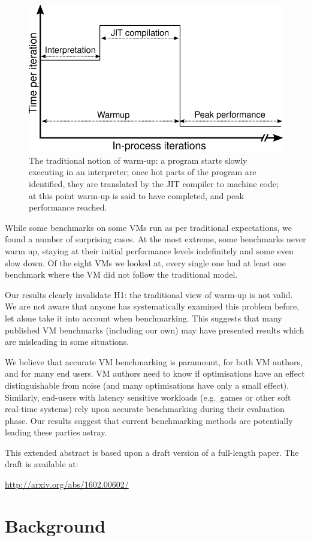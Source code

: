 \documentclass[preprint]{sigplanconf}
\newcommand{\hypone}{H1\xspace}
\begin{document}
\begin{figure}[t]
\centering
\includegraphics[width=.5\textwidth]{img/picturebook_warmup}
\caption{The traditional notion of warm-up: a program starts slowly executing in
an interpreter; once hot parts of the program are identified, they are
translated by the JIT compiler to machine code; at this point warm-up
is said to have completed, and peak performance reached.}
\label{fig:trad}
\end{figure}

While some benchmarks on some VMs run as per
traditional expectations, we found a number of surprising cases. At
the most extreme, some benchmarks never warm up, staying at their initial performance
levels indefinitely and some even slow down. Of the eight
VMs we looked at, every single one had at least one benchmark where the VM did
not follow the traditional model.

Our results clearly invalidate \hypone: the traditional view of warm-up is not
valid. We are not aware that anyone has systematically examined this
problem before, let alone take it into account when benchmarking. This suggests
that many published VM benchmarks (including our own) may have presented
results which are misleading in some situations.

We believe that accurate VM benchmarking is paramount, for both VM authors, and
for many end users. VM authors need to know if optimisations have an effect
distinguishable from noise (and many optimisations have only a small effect).
Similarly, end-users with latency sensitive workloads (e.g.~games or other soft
real-time systems) rely upon accurate benchmarking during their evaluation
phase. Our results suggest that current benchmarking methods are potentially leading
these parties astray.

This extended abstract is based upon a draft version of a full-length paper.
The draft is available at:
\begin{center}
\url{http://arxiv.org/abs/1602.00602/}
\end{center}

\section{Background}
\label{sec:warmup}
\end{document}
